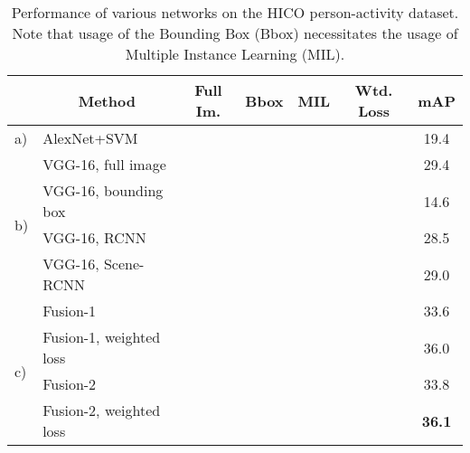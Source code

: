 \documentclass[runningheads]{llncs}
\begin{document}
\begin{table}[h!]
	\begin{center}
		\begin{tabular}{ll|c|c|c|c|c}
			\hline
			& \multicolumn{1}{c|}{\bf Method} & {\bf Full Im.} & {\bf Bbox} & {\bf MIL} & {\bf Wtd. Loss} & {\bf mAP }	\\ \hline
			a) & AlexNet+SVM~\cite{chao2015hico}	& \checkmark & & & & 19.4						\\ \hline
			\multirow{4}{*}{b)} & VGG-16, full image	& \checkmark & & & & 29.4 \\
			& VGG-16, bounding box & & \checkmark & \checkmark &  & 14.6 \\ 
			& VGG-16, RCNN & & \checkmark & \checkmark & & 28.5 		\\ 
			& VGG-16, Scene-RCNN & \checkmark & \checkmark & \checkmark & & 29.0 \\ \hline
			
			\multirow{4}{*}{c)} & Fusion-1 & \checkmark & \checkmark & \checkmark & & 33.6 \\
			& Fusion-1, weighted loss & \checkmark & \checkmark & \checkmark & \checkmark & 36.0 \\

			& Fusion-2 & \checkmark & \checkmark & \checkmark & & 33.8 \\
			& Fusion-2, weighted loss & \checkmark & \checkmark & \checkmark & \checkmark & {\bf 36.1} \\ \hline
			
\end{tabular}
	\end{center}
	\caption{Performance of various networks on the HICO person-activity dataset. Note that usage of the Bounding Box (Bbox) necessitates the usage of Multiple Instance Learning (MIL).}
\label{table:hico_results}
\end{table}
\end{document}
